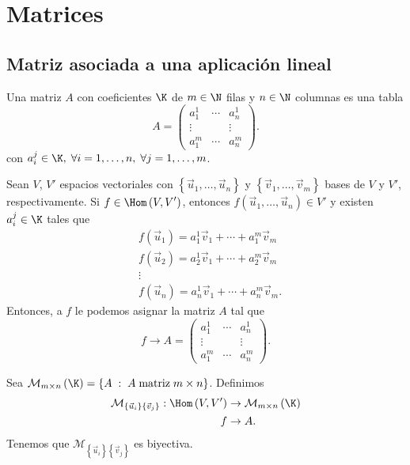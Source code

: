 \chapter{Matrices}
\section{Matriz asociada a una aplicación lineal}
\begin{fdefinition}[Matriz]
\normalfont Una matriz $\displaystyle A $ con coeficientes $\displaystyle \K $ de $\displaystyle m \in \N $ filas y $\displaystyle n \in \N $ columnas es una tabla 
\[A = \begin{pmatrix} 
	a^{1}_{1} & \cdots & a^{1}_{n} \\
	\vdots & & \vdots \\
	a^{m}_{1} & \cdots & a^{m}_{n}
\end{pmatrix} .\]
con $\displaystyle a^{j}_{i} \in \K, \; \forall i = 1, \ldots, n, \; \forall j= 1, \ldots, m  $.
\end{fdefinition}

Sean $\displaystyle V $, $\displaystyle V' $ espacios vectoriales con $\displaystyle \left\{ \vec{u}_{1}, \ldots, \vec{u}_{n}\right\}  $ y $\displaystyle \left\{ \vec{v}_{1}, \ldots, \vec{v}_{m}\right\}  $ bases de $\displaystyle V $ y $\displaystyle V' $, respectivamente. Si $\displaystyle f \in \Hom\left(V, V'\right) $, entonces $\displaystyle f\left(\vec{u}_{1}, \ldots, \vec{u}_{n}\right) \in V' $ y existen $\displaystyle a^{j}_{i} \in \K $ tales que 
\[
\begin{split}
& f\left(\vec{u}_{1}\right) = a^{1}_{1}\vec{v}_{1} + \cdots + a^{m}_{1}\vec{v}_{m} \\
& f\left(\vec{u}_{2}\right) = a^{1}_{2}\vec{v}_{1} + \cdots + a^{m}_{2}\vec{v}_{m} \\
& \vdots \\
& f\left(\vec{u}_{n}\right) = a^{1}_{n}\vec{v}_{1} + \cdots + a^{m}_{n}\vec{v}_{m}.
\end{split}
\]
Entonces, a $\displaystyle f $  le podemos asignar la matriz $\displaystyle A $ tal que 
\[f \to A = \begin{pmatrix} 
	a^{1}_{1} & \cdots & a^{1}_{n} \\
	\vdots & & \vdots \\
	a^{m}_{1} & \cdots & a^{m}_{n}
\end{pmatrix}.\]
\begin{ftheorem}[]
\normalfont 
Sea $\displaystyle \mathcal{M}_{m\times n}\left(\K\right) = \left\{ A \; : \; A \; \text{matriz} \; m\times n\right\}  $. Definimos 
\[
\begin{split}
	\mathcal{M}_{\{\vec{u}_{i}\}\{\vec{v}_{j}\}} : \Hom\left(V, V'\right) & \to \mathcal{M}_{m \times n}\left(\K\right) \\ 
 f & \to A.
\end{split}
\]
Tenemos que $\displaystyle \mathcal{M}_{ \left\{ \vec{u}_{i}\right\} \left\{ \vec{v}_{j}\right\} } $ es biyectiva.
\end{ftheorem}

